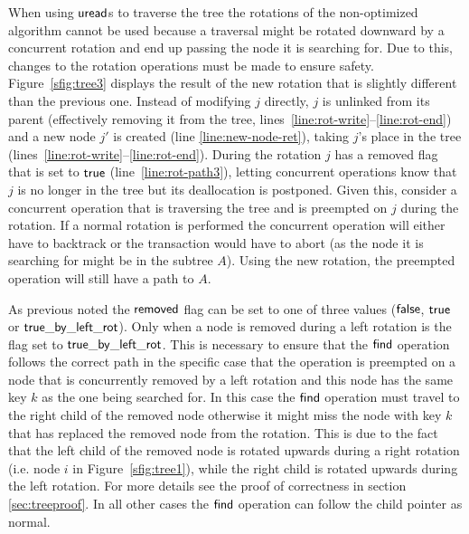 When using $\act{uread}$s to traverse the tree the rotations of the non-optimized algorithm cannot be used because a traversal
might be rotated downward by a concurrent rotation and end up passing the node it is searching for.
Due to this, changes to the rotation operations must be made to ensure safety.
Figure~\ref{sfig:tree3} displays the result of the new rotation that is slightly different than the previous one.
Instead of modifying $j$ directly, $j$ is unlinked from its parent (effectively removing it from the tree, lines~\ref{line:rot-write}--\ref{line:rot-end})
and a new node $j'$ is created (line \ref{line:new-node-ret}), taking $j$'s place in the tree (lines~\ref{line:rot-write}--\ref{line:rot-end}).
During the rotation $j$ has a removed flag that is set to $\lit{true}$ (line~\ref{line:rot-path3}), letting concurrent operations know that $j$ is no longer in the tree but its deallocation is postponed. 
Given this, consider a concurrent operation that is traversing the tree and is preempted on $j$ during the rotation.
If a normal rotation is performed the concurrent operation will either have to backtrack or the transaction would have to abort (as the node it is searching for might be in the subtree $A$).
Using the new rotation, the preempted operation will still have a path to $A$.

As previous noted the $\lit{removed}$ flag can be set to one of three values ($\lit{false}$, $\lit{true}$ or $\lit{true\_by\_left\_rot}$).
Only when a node is removed during a left rotation is the flag set to $\lit{true\_by\_left\_rot}$.
This is necessary to ensure that the $\act{find}$ operation follows the correct path in the specific case that the operation is preempted on a node that is concurrently removed by a
left rotation and this node has the same key $k$ as the one being searched for.
In this case the $\act{find}$ operation must travel to the right child of the removed node otherwise it might miss the node with key $k$ that
has replaced the removed node from the rotation.
This is due to the fact that the left child of the removed node is rotated upwards during a right rotation (i.e. node $i$ in Figure~\ref{sfig:tree1}),
while the right child is rotated upwards during the left rotation.
For more details see the proof of correctness in section \ref{sec:treeproof}.
In all other cases the $\act{find}$ operation can follow the child pointer as normal.

